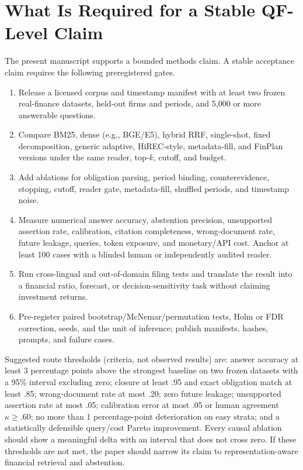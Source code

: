 \documentclass[12pt]{article}
\begin{document}
\section{What Is Required for a Stable QF-Level Claim}\label{sec:route}
The present manuscript supports a bounded methods claim. A stable acceptance claim requires the following preregistered gates.
\begin{enumerate}[leftmargin=*]
\item Release a licensed corpus and timestamp manifest with at least two frozen real-finance datasets, held-out firms and periods, and 5,000 or more answerable questions.
\item Compare BM25, dense (e.g., BGE/E5), hybrid RRF, single-shot, fixed decomposition, generic adaptive, HiREC-style, metadata-fill, and FinPlan versions under the same reader, top-$k$, cutoff, and budget.
\item Add ablations for obligation parsing, period binding, counterevidence, stopping, cutoff, reader gate, metadata-fill, shuffled periods, and timestamp noise.
\item Measure numerical answer accuracy, abstention precision, unsupported assertion rate, calibration, citation completeness, wrong-document rate, future leakage, queries, token exposure, and monetary/API cost. Anchor at least 100 cases with a blinded human or independently audited reader.
\item Run cross-lingual and out-of-domain filing tests and translate the result into a financial ratio, forecast, or decision-sensitivity task without claiming investment returns.
\item Pre-register paired bootstrap/McNemar/permutation tests, Holm or FDR correction, seeds, and the unit of inference; publish manifests, hashes, prompts, and failure cases.
\end{enumerate}

Suggested route thresholds (criteria, not observed results) are: answer accuracy at least 3 percentage points above the strongest baseline on two frozen datasets with a 95\% interval excluding zero; closure at least .95 and exact obligation match at least .85; wrong-document rate at most .20; zero future leakage; unsupported assertion rate at most .05; calibration error at most .05 or human agreement $\kappa\ge .60$; no more than 1 percentage-point deterioration on easy strata; and a statistically defensible query/cost Pareto improvement. Every causal ablation should show a meaningful delta with an interval that does not cross zero. If these thresholds are not met, the paper should narrow its claim to representation-aware financial retrieval and abstention.
\end{document}

